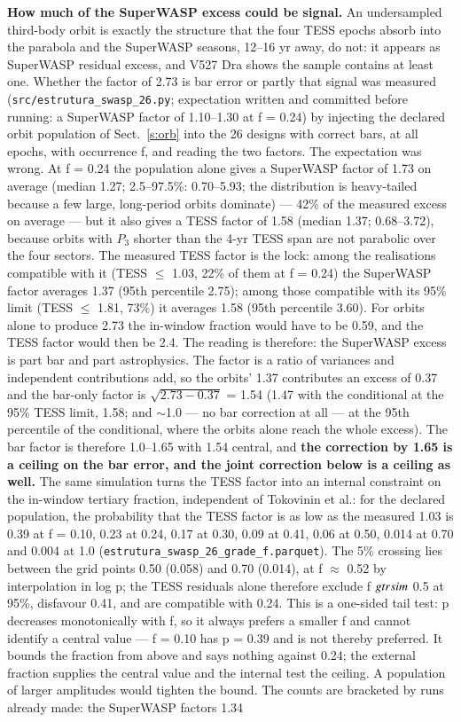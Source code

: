 \documentclass{aa}
\begin{document}
\textbf{How much of the SuperWASP excess could be signal.} An undersampled third-body orbit is exactly the structure that the four TESS epochs absorb into the parabola and the SuperWASP seasons, 12--16 yr away, do not: it appears as SuperWASP residual excess, and V527 Dra shows the sample contains at least one. Whether the factor of 2.73 is bar error or partly that signal was measured (\texttt{src/estrutura\_swasp\_26.py}; expectation written and committed before running: a SuperWASP factor of 1.10--1.30 at f = 0.24) by injecting the declared orbit population of Sect.~\ref{s:orb} into the 26 designs with correct bars, at all epochs, with occurrence f, and reading the two factors. The expectation was wrong. At f = 0.24 the population alone gives a SuperWASP factor of 1.73 on average (median 1.27; 2.5--97.5\%: 0.70--5.93; the distribution is heavy-tailed because a few large, long-period orbits dominate) --- 42\% of the measured excess on average --- but it also gives a TESS factor of 1.58 (median 1.37; 0.68--3.72), because orbits with $P_3$ shorter than the 4-yr TESS span are not parabolic over the four sectors. The measured TESS factor is the lock: among the realisations compatible with it (TESS $\le$ 1.03, 22\% of them at f = 0.24) the SuperWASP factor averages 1.37 (95th percentile 2.75); among those compatible with its 95\% limit (TESS $\le$ 1.81, 73\%) it averages 1.58 (95th percentile 3.60). For orbits alone to produce 2.73 the in-window fraction would have to be 0.59, and the TESS factor would then be 2.4. The reading is therefore: the SuperWASP excess is part bar and part astrophysics. The factor is a ratio of variances and independent contributions add, so the orbits' 1.37 contributes an excess of 0.37 and the bar-only factor is $\sqrt{2.73 - 0.37}$ = 1.54 (1.47 with the conditional at the 95\% TESS limit, 1.58; and $\sim$1.0 --- no bar correction at all --- at the 95th percentile of the conditional, where the orbits alone reach the whole excess). The bar factor is therefore 1.0--1.65 with 1.54 central, and \textbf{the correction by 1.65 is a ceiling on the bar error, and the joint correction below is a ceiling as well.} The same simulation turns the TESS factor into an internal constraint on the in-window tertiary fraction, independent of Tokovinin et al.: for the declared population, the probability that the TESS factor is as low as the measured 1.03 is 0.39 at f = 0.10, 0.23 at 0.24, 0.17 at 0.30, 0.09 at 0.41, 0.06 at 0.50, 0.014 at 0.70 and 0.004 at 1.0 (\texttt{estrutura\_swasp\_26\_grade\_f.parquet}). The 5\% crossing lies between the grid points 0.50 (0.058) and 0.70 (0.014), at f $\approx$ 0.52 by interpolation in log p; the TESS residuals alone therefore exclude f $\\gtrsim$ 0.5 at 95\%, disfavour 0.41, and are compatible with 0.24. This is a one-sided tail test: p decreases monotonically with f, so it always prefers a smaller f and cannot identify a central value --- f = 0.10 has p = 0.39 and is not thereby preferred. It bounds the fraction from above and says nothing against 0.24; the external fraction supplies the central value and the internal test the ceiling. A population of larger amplitudes would tighten the bound. The counts are bracketed by runs already made: the SuperWASP factors 1.34 
\end{document}
